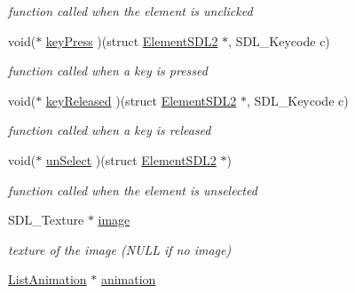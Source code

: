 \begin{DoxyCompactItemize}
\begin{DoxyCompactList}\small\item\em function called when the element is unclicked \end{DoxyCompactList}\item 
void($\ast$ \hyperlink{structElementSDL2_aff1dc935700d44a0ef0d53de7cca9d41}{key\+Press} )(struct \hyperlink{structElementSDL2}{Element\+S\+D\+L2} $\ast$, S\+D\+L\+\_\+\+Keycode c)\hypertarget{structElementSDL2_aff1dc935700d44a0ef0d53de7cca9d41}{}\label{structElementSDL2_aff1dc935700d44a0ef0d53de7cca9d41}

\begin{DoxyCompactList}\small\item\em function called when a key is pressed \end{DoxyCompactList}\item 
void($\ast$ \hyperlink{structElementSDL2_a76ecf85adcb072db772a8351ea7e04ee}{key\+Released} )(struct \hyperlink{structElementSDL2}{Element\+S\+D\+L2} $\ast$, S\+D\+L\+\_\+\+Keycode c)\hypertarget{structElementSDL2_a76ecf85adcb072db772a8351ea7e04ee}{}\label{structElementSDL2_a76ecf85adcb072db772a8351ea7e04ee}

\begin{DoxyCompactList}\small\item\em function called when a key is released \end{DoxyCompactList}\item 
void($\ast$ \hyperlink{structElementSDL2_a8057ee0d19cdd60ec568076206ee0e12}{un\+Select} )(struct \hyperlink{structElementSDL2}{Element\+S\+D\+L2} $\ast$)\hypertarget{structElementSDL2_a8057ee0d19cdd60ec568076206ee0e12}{}\label{structElementSDL2_a8057ee0d19cdd60ec568076206ee0e12}

\begin{DoxyCompactList}\small\item\em function called when the element is unselected \end{DoxyCompactList}\item 
S\+D\+L\+\_\+\+Texture $\ast$ \hyperlink{structElementSDL2_aab2ff0fd3a1c4370d7f1f9cdd250d056}{image}\hypertarget{structElementSDL2_aab2ff0fd3a1c4370d7f1f9cdd250d056}{}\label{structElementSDL2_aab2ff0fd3a1c4370d7f1f9cdd250d056}

\begin{DoxyCompactList}\small\item\em texture of the image (N\+U\+LL if no image) \end{DoxyCompactList}\item 
\hyperlink{structListAnimation}{List\+Animation} $\ast$ \hyperlink{structElementSDL2_a9b7927abbd7b67f843758ff65436fbb5}{animation}\hypertarget{structElementSDL2_a9b7927abbd7b67f843758ff65436fbb5}{}\label{structElementSDL2_a9b7927abbd7b67f843758ff65436fbb5}


\end{DoxyCompactItemize}
